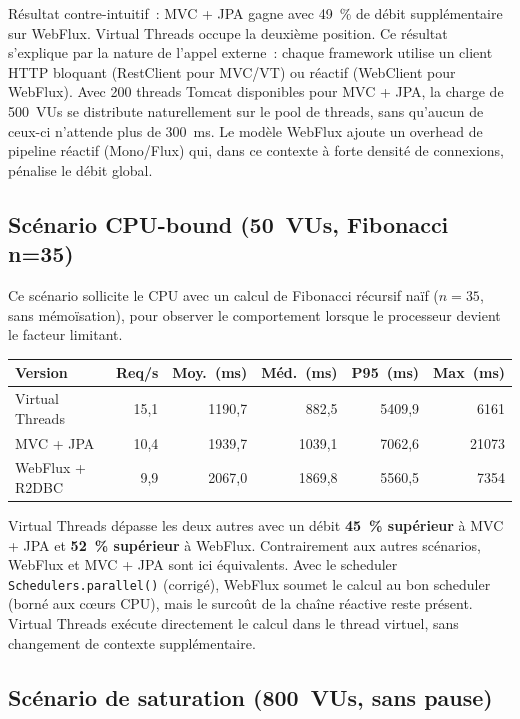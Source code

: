 Résultat contre-intuitif~: MVC + JPA gagne avec 49~\% de débit supplémentaire sur WebFlux.
Virtual Threads occupe la deuxième position. Ce résultat s'explique par la nature de l'appel
externe~: chaque framework utilise un client HTTP bloquant (RestClient pour MVC/VT) ou réactif
(WebClient pour WebFlux). Avec 200 threads Tomcat disponibles pour MVC + JPA, la charge de 500~VUs
se distribute naturellement sur le pool de threads, sans qu'aucun de ceux-ci n'attende plus de
300~ms. Le modèle WebFlux ajoute un overhead de pipeline réactif (Mono/Flux) qui, dans ce
contexte à forte densité de connexions, pénalise le débit global.

\subsection{Scénario CPU-bound (50~VUs, Fibonacci n=35)}

Ce scénario sollicite le CPU avec un calcul de Fibonacci récursif naïf ($n=35$, sans mémoïsation),
pour observer le comportement lorsque le processeur devient le facteur limitant.

\begin{center}
\begin{tabular}{|l|r|r|r|r|r|}
\hline
\textbf{Version} & \textbf{Req/s} & \textbf{Moy.~(ms)} & \textbf{Méd.~(ms)} & \textbf{P95~(ms)} & \textbf{Max~(ms)} \\
\hline
Virtual Threads  & 15,1 & 1190,7 & 882,5  & 5409,9 & 6161 \\
MVC + JPA        & 10,4 & 1939,7 & 1039,1 & 7062,6 & 21073 \\
WebFlux + R2DBC  &  9,9 & 2067,0 & 1869,8 & 5560,5 & 7354 \\
\hline
\end{tabular}
\end{center}

Virtual Threads dépasse les deux autres avec un débit \textbf{45~\% supérieur} à MVC + JPA et
\textbf{52~\% supérieur} à WebFlux. Contrairement aux autres scénarios, WebFlux et MVC + JPA
sont ici équivalents. Avec le scheduler \texttt{Schedulers.parallel()} (corrigé), WebFlux soumet
le calcul au bon scheduler (borné aux cœurs CPU), mais le surcoût de la chaîne réactive reste
présent. Virtual Threads exécute directement le calcul dans le thread virtuel, sans changement de
contexte supplémentaire.

\subsection{Scénario de saturation (800~VUs, sans pause)}
\label{sec:saturation}

